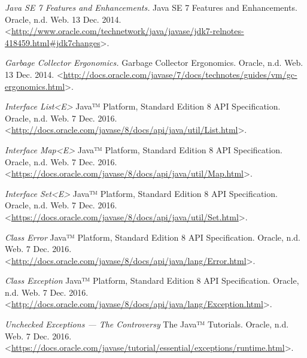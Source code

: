 \begin{thebibliography}{9}

\textit{Java SE 7 Features and Enhancements.} Java SE 7 Features and Enhancements. Oracle, n.d. Web. 13 Dec. 2014. <\url{http://www.oracle.com/technetwork/java/javase/jdk7-relnotes-418459.html#jdk7changes}>.


\textit{Garbage Collector Ergonomics.} Garbage Collector Ergonomics. Oracle, n.d. Web. 13 Dec. 2014. <\url{http://docs.oracle.com/javase/7/docs/technotes/guides/vm/gc-ergonomics.html}>.


\textit{Interface List<E>} Java™ Platform, Standard Edition 8
API Specification. Oracle, n.d. Web. 7 Dec. 2016. <\url{http://docs.oracle.com/javase/8/docs/api/java/util/List.html}>.


\textit{Interface Map<E>} Java™ Platform, Standard Edition 8
API Specification. Oracle, n.d. Web. 7 Dec. 2016. <\url{https://docs.oracle.com/javase/8/docs/api/java/util/Map.html}>.


\textit{Interface Set<E>} Java™ Platform, Standard Edition 8
API Specification. Oracle, n.d. Web. 7 Dec. 2016. <\url{https://docs.oracle.com/javase/8/docs/api/java/util/Set.html}>.


\textit{Class Error} Java™ Platform, Standard Edition 8
API Specification. Oracle, n.d. Web. 7 Dec. 2016. <\url{http://docs.oracle.com/javase/8/docs/api/java/lang/Error.html}>.


\textit{Class Exception} Java™ Platform, Standard Edition 8
API Specification. Oracle, n.d. Web. 7 Dec. 2016. <\url{http://docs.oracle.com/javase/8/docs/api/java/lang/Exception.html}>.


\textit{Unchecked Exceptions — The Controversy} The Java™ Tutorials. Oracle, n.d. Web. 7 Dec. 2016. <\url{https://docs.oracle.com/javase/tutorial/essential/exceptions/runtime.html}>.


\end{thebibliography}